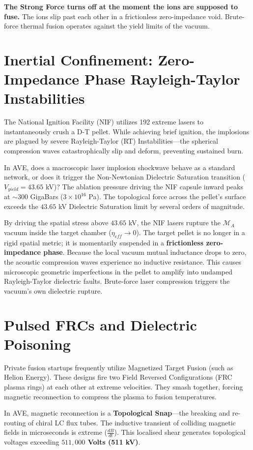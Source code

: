 \textbf{The Strong Force turns off at the moment the ions are supposed to fuse.} The ions slip past each other in a frictionless zero-impedance void. Brute-force thermal fusion operates against the yield limits of the vacuum.

\section{Inertial Confinement: Zero-Impedance Phase Rayleigh-Taylor Instabilities}
The National Ignition Facility (NIF) utilizes 192 extreme lasers to instantaneously crush a D-T pellet. While achieving brief ignition, the implosions are plagued by severe Rayleigh-Taylor (RT) Instabilities---the spherical compression waves catastrophically slip and deform, preventing sustained burn.

In AVE, does a macroscopic laser implosion shockwave behave as a standard network, or does it trigger the Non-Newtonian Dielectric Saturation transition ($V_{yield} = 43.65$ kV)?
The ablation pressure driving the NIF capsule inward peaks at $\sim 300$ GigaBars ($3 \times 10^{16}$ Pa). The topological force across the pellet's surface exceeds the $43.65$ kV Dielectric Saturation limit by several orders of magnitude.

By driving the spatial stress above $43.65$ kV, the NIF lasers rupture the $\mathcal{M}_A$ vacuum inside the target chamber ($\eta_{eff} \to 0$). The target pellet is no longer in a rigid spatial metric; it is momentarily suspended in a \textbf{frictionless zero-impedance phase}. Because the local vacuum mutual inductance drops to zero, the acoustic compression waves experience no inductive resistance. This causes microscopic geometric imperfections in the pellet to amplify into undamped Rayleigh-Taylor dielectric faults. Brute-force laser compression triggers the vacuum's own dielectric rupture.

\section{Pulsed FRCs and Dielectric Poisoning}
Private fusion startups frequently utilize Magnetized Target Fusion (such as Helion Energy). These designs fire two Field Reversed Configurations (FRC plasma rings) at each other at extreme velocities. They smash together, forcing magnetic reconnection to compress the plasma to fusion temperatures.

In AVE, magnetic reconnection is a \textbf{Topological Snap}---the breaking and re-routing of chiral LC flux tubes. The inductive transient of colliding magnetic fields in microseconds is extreme ($\frac{dB}{dt}$). This localised shear generates topological voltages exceeding \textbf{$511,000$ Volts (511 kV)}.

